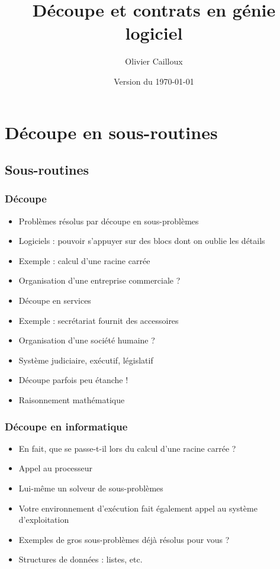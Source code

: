 \documentclass[english, french]{beamer}
\title{Découpe et contrats en génie logiciel}
\subtitle{}
\author{Olivier Cailloux}
\institute[LAMSADE]{LAMSADE, Université Paris-Dauphine}
\date{Version du \today}
\begin{document}


\begin{frame}[plain]
   \titlepage
\end{frame}
\addtocounter{framenumber}{-1}

\section{Découpe en sous-routines}
\subsection{Sous-routines}
\begin{frame}
	\frametitle{Découpe}
	\begin{itemize}
		\item Problèmes résolus par découpe en sous-problèmes
		\item Logiciels : pouvoir s’appuyer sur des blocs dont on oublie les détails
		\item Exemple : calcul d’une racine carrée
		\item Organisation d’une entreprise commerciale ? \pause
		\item Découpe en services
		\item Exemple : secrétariat fournit des accessoires
		\item Organisation d’une société humaine ? \pause
		\item Système judiciaire, exécutif, législatif
		\item Découpe parfois peu étanche !
		\item Raisonnement mathématique
	\end{itemize}
\end{frame}

\begin{frame}
	\frametitle{Découpe en informatique}
	\begin{itemize}
		\item En fait, que se passe-t-il lors du calcul d’une racine carrée ? \pause
		\item Appel au processeur
		\item Lui-même un solveur de sous-problèmes
		\item Votre environnement d’exécution fait également appel au système d’exploitation
		\item Exemples de gros sous-problèmes déjà résolus pour vous ? \pause
		\item Structures de données : listes, etc.
	\end{itemize}
\end{frame}
\end{document}
